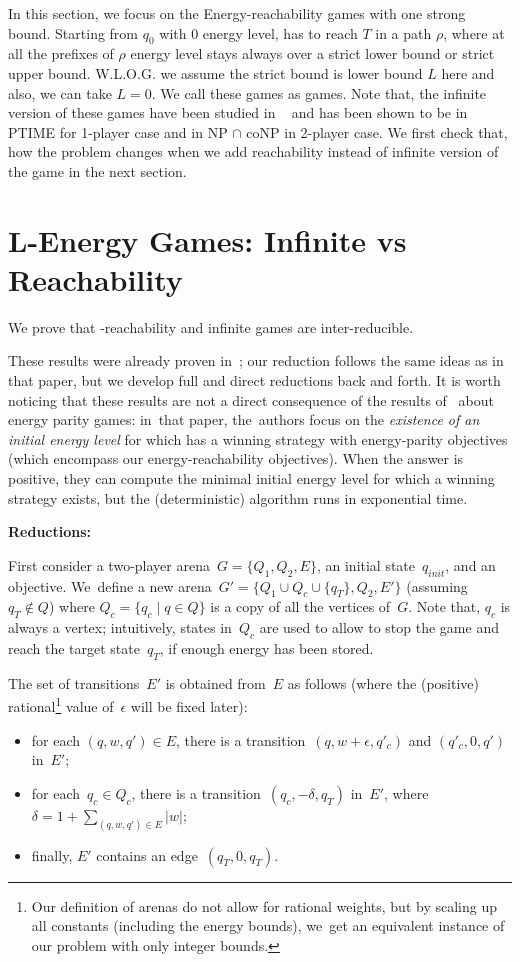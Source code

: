 In this section, we focus on the Energy-reachability games with one strong bound. Starting from $q_0$ with 0 energy level,  has to reach $T$ in a path $\rho$, where at all the prefixes of $\rho$ energy level stays always over a strict lower bound or strict upper bound. W.L.O.G. we assume the strict bound is lower bound $L$ here and also, we can take $L=0$. We call these games as \Lenergy games. Note that, the infinite version of these games have been studied in ~\cite{BouyerFLMS08} and has been shown to be in PTIME for 1-player case and in NP $\cap$ coNP in 2-player case. We first check that, how the problem changes when we add reachability instead of infinite version of the game in the next section.
\section{L-Energy Games: Infinite vs Reachability}
We prove that \Lenergy-reachability and \Lenergy infinite games are inter-reducible.
\vskip 0.3cm
\begin{remark}
These results were already proven in~\cite{Chatterjee0H17}; 
our reduction follows the same ideas as in that paper, but
we develop full and direct reductions back and forth. It is worth noticing that these results are not a direct consequence of
the results of~\cite{ChatterjeeD12} about energy parity games:
in~that paper, the~authors focus on the \emph{existence of an initial energy level} for which  has a winning strategy with energy-parity objectives (which encompass our energy-reachability objectives). When the answer is positive, they can compute the minimal initial energy level for which a winning strategy exists, but the (deterministic) algorithm runs in exponential time.
\end{remark}
\vskip 0.3cm

\textbf{Reductions: }
\vskip 0.2cm


First consider a two-player arena~$G=\{Q_1,Q_2,E\}$, an initial
state~$q_{init}$, and an \Lenergy objective.  We~define a new
arena~$G'=\{Q_1\cup Q_c\cup\{q_T\}, Q_2,E'\}$ (assuming~$q_T\notin Q$)
where $Q_c=\{q_c\mid  q \in Q\}$ is a copy of all the vertices of~$G$.
%
Note that, $q_c$ is always a  vertex; intuitively, states in~$Q_c$ are used to allow  to stop the game and reach the target state~$q_T$, if enough energy has been stored.


The set of transitions~$E'$ is obtained from~$E$ as follows
(where the (positive)
rational\footnote{Our definition of arenas do not allow for rational
weights, but by scaling up all constants (including the energy
bounds), we~get an equivalent instance of our problem with only
integer bounds.}  value of~$\epsilon$ will be fixed later):
\begin{itemize}
\item for each $(q,w,q')\in E$, there is a
  transition~$(q,w+\epsilon,q'_c)$ and $(q'_c,0,q')$ in~$E'$;
\item for each~$q_c\in Q_c$, there is a transition~$(q_c,-\delta,q_T)$
  in~$E'$, where $\delta=1+\sum_{(q,w,q')\in E} |w|$;
\item finally, $E'$ contains an edge~$(q_T,0,q_T)$.
\end{itemize}

